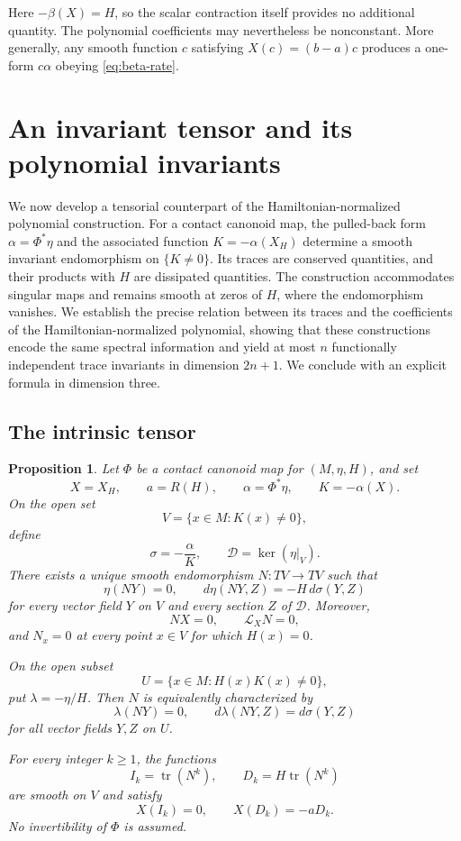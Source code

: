 \documentclass[11pt,a4paper]{article}
\numberwithin{equation}{section}
\newtheorem{proposition}{Proposition}
\theoremstyle{definition}
\theoremstyle{remark}
\begin{document}
Here $-\beta(X)=H$, so the scalar contraction itself
provides no additional quantity. The polynomial
coefficients may nevertheless be nonconstant.
More generally, any smooth function $c$ satisfying
$X(c)=(b-a)c$ produces a one-form $c\alpha$ obeying
\eqref{eq:beta-rate}.





\section{An invariant tensor and its polynomial invariants}
\label{sec:tensor}

We now develop a tensorial counterpart of the
Hamiltonian-normalized polynomial construction.
For a contact canonoid map, the pulled-back form
$\alpha=\Phi^*\eta$ and the associated function
$K=-\alpha(X_H)$ determine a smooth invariant endomorphism
on $\{K\neq0\}$. Its traces are conserved quantities,
and their products with $H$ are dissipated quantities.
The construction accommodates singular maps and remains
smooth at zeros of $H$, where the endomorphism vanishes.
We establish the precise relation between its traces and
the coefficients of the Hamiltonian-normalized polynomial,
showing that these constructions encode the same spectral
information and yield at most $n$ functionally independent
trace invariants in dimension $2n+1$. We conclude with an
explicit formula in dimension three.



\subsection{The intrinsic tensor}

\begin{proposition}
\label{prop:tensor}
Let $\Phi$ be a contact canonoid map for $(M,\eta,H)$, and set
\[
X=X_H,\qquad a=R(H),\qquad
\alpha=\Phi^*\eta,\qquad K=-\alpha(X).
\]
On the open set
\[
V=\{x\in M:K(x)\neq0\},
\]
define
\[
\sigma=-\frac{\alpha}{K},
\qquad
\mathcal D=\ker(\eta|_V).
\]
There exists a unique smooth endomorphism $N:TV\to TV$ such that
\[
\eta(NY)=0,
\qquad
d\eta(NY,Z)=-H\,d\sigma(Y,Z)
\]
for every vector field $Y$ on $V$ and every section $Z$ of
$\mathcal D$. Moreover,
\[
NX=0,\qquad \mathcal L_XN=0,
\]
and $N_x=0$ at every point $x\in V$ for which $H(x)=0$.

On the open subset
\[
U=\{x\in M:H(x)K(x)\neq0\},
\]
put $\lambda=-\eta/H$. Then $N$ is equivalently characterized by
\[
\lambda(NY)=0,
\qquad
d\lambda(NY,Z)=d\sigma(Y,Z)
\]
for all vector fields $Y,Z$ on $U$.

For every integer $k\geq1$, the functions
\[
I_k=\operatorname{tr}(N^k),
\qquad
D_k=H\operatorname{tr}(N^k)
\]
are smooth on $V$ and satisfy
\[
X(I_k)=0,\qquad X(D_k)=-aD_k.
\]
No invertibility of $\Phi$ is assumed.
\end{proposition}
\end{document}
